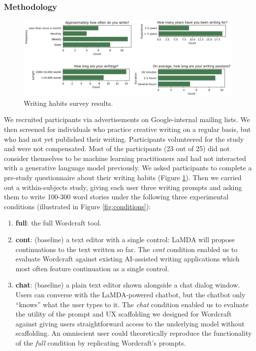 \subsubsection{Methodology} 

\begin{figure}[tbp]
  \centering
  \includegraphics[width=\linewidth]{figures/recruitment_survey.png}
  \caption{Writing habits survey results.}
  \label{fig:writing_habits}
\end{figure}

\noindent We recruited participants via advertisements on Google-internal mailing lists. We then screened for individuals who practice creative writing on a regular basis, but who had not yet published their writing. 
Participants volunteered for the study and were not compensated. 
Most of the participants (23 out of 25) did not consider themselves to be machine learning practitioners and had not interacted with a generative language model previously.
We asked participants to complete a pre-study questionnaire about their writing habits (Figure \ref{fig:writing_habits}).
Then we carried out a within-subjects study, giving each user three writing prompts and asking them to write 100-300 word stories under the following three experimental conditions (illustrated in Figure \ref{fig:conditions}):

\begin{enumerate}
    \item \textbf{full}: the full Wordcraft tool.
    \item \textbf{cont}: (baseline) a text editor with a single control: LaMDA will propose continuations to the text written so far. The \textit{cont} condition enabled us to evaluate Wordcraft against existing AI-assisted writing applications which most often feature continuation as a single control.
    \item \textbf{chat}: (baseline) a plain text editor shown alongside a chat dialog window.
    Users can converse with the LaMDA-powered chatbot, but the chatbot only ``knows'' what the user types to it.
    The \textit{chat} condition enabled us to evaluate the utility of the prompt and UX scaffolding we designed for Wordcraft against giving users straightforward access to the underlying model without scaffolding. An omniscient user could theoretically reproduce the functionality of the \textit{full} condition by replicating Wordcraft's prompts.
\end{enumerate}

